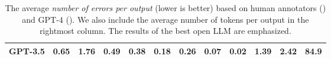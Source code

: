 \begin{table}[t]
\begin{tabular}{lccccccccccr}
        \textbf{GPT-3.5} & 0.65                                   & 1.76                                       & 0.49                                    & 0.38                               & 0.18                                  & 0.26          & 0.07           & 0.02          & 1.39           & 2.42          & 84.9          \\ \bottomrule
    \end{tabular}
    \caption[The average number of errors per output.]{The average \textit{number of errors per output} (lower is better) based on human annotators (\humanmetric{}) and GPT-4 (\gptmetric{}). We also include the average number of tokens per output in the rightmost column. The results of the best open LLM  are emphasized.}
    \label{tab:quintd:results_agg}
\end{table}



